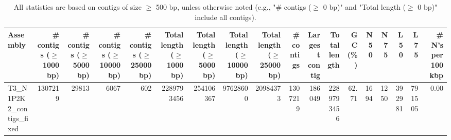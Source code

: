 \documentclass[12pt,a4paper]{article}
\begin{document}
\begin{table}[ht]
\begin{center}
\caption{All statistics are based on contigs of size $\geq$ 500 bp, unless otherwise noted (e.g., "\# contigs ($\geq$ 0 bp)" and "Total length ($\geq$ 0 bp)" include all contigs).}
\begin{tabular}{|l*{17}{|r}|}
\hline
Assembly & \# contigs ($\geq$ 1000 bp) & \# contigs ($\geq$ 5000 bp) & \# contigs ($\geq$ 10000 bp) & \# contigs ($\geq$ 25000 bp) & Total length ($\geq$ 1000 bp) & Total length ($\geq$ 5000 bp) & Total length ($\geq$ 10000 bp) & Total length ($\geq$ 25000 bp) & \# contigs & Largest contig & Total length & GC (\%) & N50 & N75 & L50 & L75 & \# N's per 100 kbp \\ \hline
T3\_N1P2K2\_contigs\_fixed & 1307219 & 29813 & 6067 & 602 & 2289793456 & 254106367 & 97628600 & 20984373 & 1307219 & 186049 & 2289793456 & 62.71 & 1694 & 1250 & 392981 & 791505 & 0.00 \\ \hline
\end{tabular}
\end{center}
\end{table}
\end{document}
